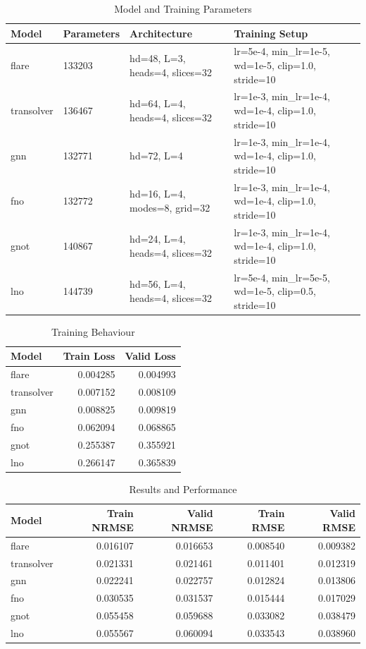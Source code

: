 \begin{table}[ht]
\centering
\caption{Model and Training Parameters}
\begin{tabular}{lp{1.8cm}p{4.5cm}p{6.2cm}}
\hline
Model & Parameters & Architecture & Training Setup \\
\hline
flare & 133203 & hd=48, L=3, heads=4, slices=32 & lr=5e-4, min\_lr=1e-5, wd=1e-5, clip=1.0, stride=10 \\
transolver & 136467 & hd=64, L=4, heads=4, slices=32 & lr=1e-3, min\_lr=1e-4, wd=1e-4, clip=1.0, stride=10 \\
gnn & 132771 & hd=72, L=4 & lr=1e-3, min\_lr=1e-4, wd=1e-4, clip=1.0, stride=10 \\
fno & 132772 & hd=16, L=4, modes=8, grid=32 & lr=1e-3, min\_lr=1e-4, wd=1e-4, clip=1.0, stride=10 \\
gnot & 140867 & hd=24, L=4, heads=4, slices=32 & lr=1e-3, min\_lr=1e-4, wd=1e-4, clip=1.0, stride=10 \\
lno & 144739 & hd=56, L=4, heads=4, slices=32 & lr=5e-4, min\_lr=5e-5, wd=1e-5, clip=0.5, stride=10 \\
\hline
\end{tabular}
\end{table}

\begin{table}[ht]
\centering
\caption{Training Behaviour}
\begin{tabular}{lrr}
\hline
Model & Train Loss & Valid Loss \\
\hline
flare & 0.004285 & 0.004993 \\
transolver & 0.007152 & 0.008109 \\
gnn & 0.008825 & 0.009819 \\
fno & 0.062094 & 0.068865 \\
gnot & 0.255387 & 0.355921 \\
lno & 0.266147 & 0.365839 \\
\hline
\end{tabular}
\end{table}

\begin{table}[ht]
\centering
\caption{Results and Performance}
\begin{tabular}{lrrrr}
\hline
Model & Train NRMSE & Valid NRMSE & Train RMSE & Valid RMSE \\
\hline
flare & 0.016107 & 0.016653 & 0.008540 & 0.009382 \\
transolver & 0.021331 & 0.021461 & 0.011401 & 0.012319 \\
gnn & 0.022241 & 0.022757 & 0.012824 & 0.013806 \\
fno & 0.030535 & 0.031537 & 0.015444 & 0.017029 \\
gnot & 0.055458 & 0.059688 & 0.033082 & 0.038479 \\
lno & 0.055567 & 0.060094 & 0.033543 & 0.038960 \\
\hline
\end{tabular}
\end{table}
